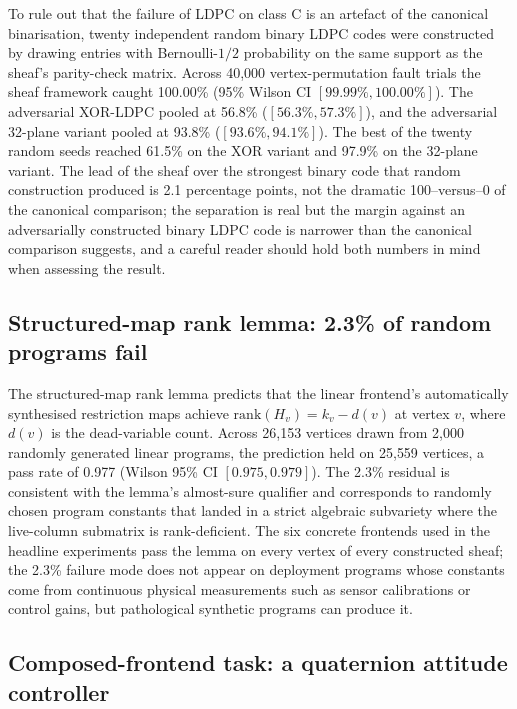\documentclass[12pt,a4paper]{article}
\theoremstyle{plain}
\theoremstyle{definition}
\begin{document}
To rule out that the failure of LDPC on class C is an artefact of the canonical binarisation, twenty independent random binary LDPC codes were constructed by drawing entries with Bernoulli-$1/2$ probability on the same support as the sheaf's parity-check matrix. Across 40{,}000 vertex-permutation fault trials the sheaf framework caught 100.00\% (95\% Wilson CI $[99.99\%, 100.00\%]$). The adversarial XOR-LDPC pooled at 56.8\% ($[56.3\%, 57.3\%]$), and the adversarial 32-plane variant pooled at 93.8\% ($[93.6\%, 94.1\%]$). The best of the twenty random seeds reached 61.5\% on the XOR variant and 97.9\% on the 32-plane variant. The lead of the sheaf over the strongest binary code that random construction produced is 2.1 percentage points, not the dramatic 100--versus--0 of the canonical comparison; the separation is real but the margin against an adversarially constructed binary LDPC code is narrower than the canonical comparison suggests, and a careful reader should hold both numbers in mind when assessing the result.

\subsection{Structured-map rank lemma: 2.3\% of random programs fail}

The structured-map rank lemma predicts that the linear frontend's automatically synthesised restriction maps achieve $\mathrm{rank}(H_v) = k_v - d(v)$ at vertex $v$, where $d(v)$ is the dead-variable count. Across 26{,}153 vertices drawn from 2{,}000 randomly generated linear programs, the prediction held on 25{,}559 vertices, a pass rate of 0.977 (Wilson 95\% CI $[0.975, 0.979]$). The 2.3\% residual is consistent with the lemma's almost-sure qualifier and corresponds to randomly chosen program constants that landed in a strict algebraic subvariety where the live-column submatrix is rank-deficient. The six concrete frontends used in the headline experiments pass the lemma on every vertex of every constructed sheaf; the 2.3\% failure mode does not appear on deployment programs whose constants come from continuous physical measurements such as sensor calibrations or control gains, but pathological synthetic programs can produce it.

\subsection{Composed-frontend task: a quaternion attitude controller}
\end{document}

